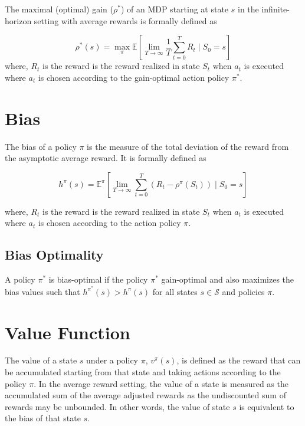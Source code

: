 The maximal (optimal) gain ($\rho^*$) of an MDP starting at state $s$ in the infinite-horizon setting with average rewards is formally defined as

\begin{equation}
    \label{eqn:gain_opt}
    \rho^*(s) = \max_\pi \mathbb{E}\left[\lim_{T \to \infty} \frac{1}{T} \sum_{t=0}^{T} R_t \mid S_0 = s\right]
\end{equation}
where, $R_t$ is the reward is the reward realized in state $S_t$ when $a_t$ is executed where $a_t$ is chosen according to the gain-optimal action policy $\pi^*$.

\section{Bias}

The bias of a policy $\pi$ is the measure of the total deviation of the reward from the asymptotic average reward.
It is formally defined as

\begin{equation}
    \label{eqn:bias}
    h^\pi(s) = \mathbb{E}^\pi\left[\lim_{T \to \infty} \sum_{t=0}^{T} (R_t - \rho^\pi(S_t)) \mid S_0 = s\right]
\end{equation}

where, $R_t$ is the reward is the reward realized in state $S_t$ when $a_t$ is executed where $a_t$ is chosen according to the action policy $\pi$.

\subsection*{Bias Optimality}

A policy $\pi^*$ is bias-optimal if the policy $\pi^*$ gain-optimal and also maximizes the bias values such that $h^\pi^*(s) > h^\pi(s)$ for all states $s \in \mathcal{S}$ and policies $\pi$.

\section{Value Function}

The value of a state $s$ under a policy $\pi$, $v^\pi(s)$, is defined as the reward that can be accumulated starting from that state and taking actions according to the policy $\pi$. 
In the average reward setting, the value of a state is measured as the accumulated sum of the average adjusted rewards as the undiscounted sum of rewards may be unbounded.
In other words, the value of state $s$ is equivalent to the bias of that state $s$.

